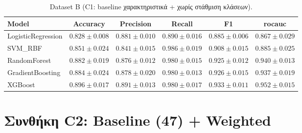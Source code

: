 \begin{table}[H]
    \centering
    \caption{Dataset B (C1: baseline χαρακτηριστικά + χωρίς στάθμιση κλάσεων).}
    \label{tab:appendix-c1-dataset-b}
    \scriptsize
    \begin{tabular}{@{}lccccc@{}}
        \toprule
        Model & Accuracy & Precision & Recall & F1 & \gls{rocauc} \\
        \midrule
        LogisticRegression & $0.828 \pm 0.008$ & $0.881 \pm 0.010$ & $0.890 \pm 0.016$ & $0.885 \pm 0.006$ & $0.867 \pm 0.029$ \\
        SVM\_RBF & $0.851 \pm 0.024$ & $0.841 \pm 0.015$ & $0.986 \pm 0.019$ & $0.908 \pm 0.015$ & $0.885 \pm 0.025$ \\
        RandomForest & $0.882 \pm 0.019$ & $0.876 \pm 0.012$ & $0.980 \pm 0.015$ & $0.925 \pm 0.012$ & $0.940 \pm 0.013$ \\
        GradientBoosting & $0.884 \pm 0.024$ & $0.878 \pm 0.020$ & $0.980 \pm 0.013$ & $0.926 \pm 0.015$ & $0.937 \pm 0.019$ \\
        XGBoost & $0.896 \pm 0.017$ & $0.891 \pm 0.013$ & $0.980 \pm 0.017$ & $0.933 \pm 0.011$ & $0.952 \pm 0.015$ \\
        \bottomrule
    \end{tabular}
\end{table}

\section{Συνθήκη C2: Baseline (47) + Weighted}

